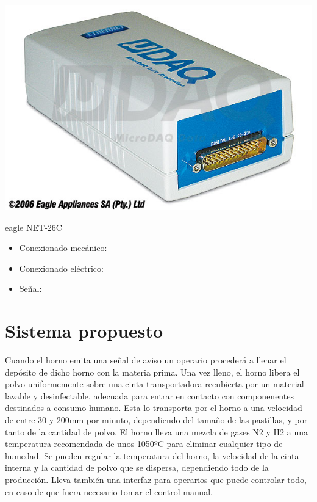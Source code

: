 	\includegraphics[scale=0.4]{Datasheets/10Foto.jpg}

	eagle NET-26C 
		\begin{itemize}
				\item{Conexionado mecánico:}\\
				
				\item{Conexionado eléctrico:}\\
				
				\item{Señal:}\\
				
		\end{itemize}

\newpage

	

\section{Sistema propuesto}


Cuando el horno emita una señal de aviso un operario procederá a llenar el depósito de dicho horno con la materia prima. Una vez lleno, el horno libera el polvo uniformemente sobre una cinta transportadora recubierta por un material lavable y desinfectable, adecuada para entrar en contacto con componenentes destinados a consumo humano. Esta lo transporta por el horno a una velocidad de entre 30 y 200mm por minuto, dependiendo del tamaño de las pastillas, y por tanto de la cantidad de polvo. El horno lleva una mezcla de gases N2 y H2 a una temperatura recomendada de unos 1050ºC para eliminar cualquier tipo de humedad. Se pueden regular la temperatura del horno, la velocidad de la cinta interna y la cantidad de polvo que se dispersa, dependiendo todo de la producción. Lleva también una interfaz para operarios que puede controlar todo, en caso de que fuera necesario tomar el control manual.
\\

